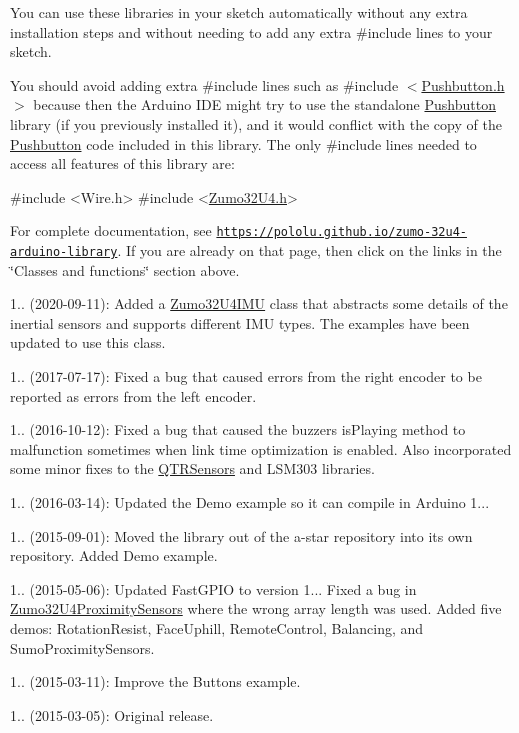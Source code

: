 You can use these libraries in your sketch automatically without any extra installation steps and without needing to add any extra {\ttfamily \#include} lines to your sketch.

You should avoid adding extra {\ttfamily \#include} lines such as {\ttfamily \#include $<$\hyperlink{_pushbutton_8h}{Pushbutton.\+h}$>$} because then the Arduino I\+DE might try to use the standalone \hyperlink{class_pushbutton}{Pushbutton} library (if you previously installed it), and it would conflict with the copy of the \hyperlink{class_pushbutton}{Pushbutton} code included in this library. The only {\ttfamily \#include} lines needed to access all features of this library are\+:


\begin{DoxyCode}
\textcolor{preprocessor}{#include <Wire.h>}
\textcolor{preprocessor}{#include <\hyperlink{_zumo32_u4_8h}{Zumo32U4.h}>}
\end{DoxyCode}


For complete documentation, see \href{https://pololu.github.io/zumo-32u4-arduino-library}{\tt https\+://pololu.\+github.\+io/zumo-\/32u4-\/arduino-\/library}. If you are already on that page, then click on the links in the \char`\"{}\+Classes and functions\char`\"{} section above.


\begin{DoxyItemize}
\item 1.. (2020-\/09-\/11)\+: Added a \hyperlink{class_zumo32_u4_i_m_u}{Zumo32\+U4\+I\+MU} class that abstracts some details of the inertial sensors and supports different I\+MU types. The examples have been updated to use this class.
\item 1.. (2017-\/07-\/17)\+: Fixed a bug that caused errors from the right encoder to be reported as errors from the left encoder.
\item 1.. (2016-\/10-\/12)\+: Fixed a bug that caused the buzzer\textquotesingle{}s {\ttfamily is\+Playing} method to malfunction sometimes when link time optimization is enabled. Also incorporated some minor fixes to the \hyperlink{class_q_t_r_sensors}{Q\+T\+R\+Sensors} and L\+S\+M303 libraries.
\item 1.. (2016-\/03-\/14)\+: Updated the Demo example so it can compile in Arduino 1...
\item 1.. (2015-\/09-\/01)\+: Moved the library out of the a-\/star repository into its own repository. Added Demo example.
\item 1.. (2015-\/05-\/06)\+: Updated Fast\+G\+P\+IO to version 1... Fixed a bug in \hyperlink{class_zumo32_u4_proximity_sensors}{Zumo32\+U4\+Proximity\+Sensors} where the wrong array length was used. Added five demos\+: Rotation\+Resist, Face\+Uphill, Remote\+Control, Balancing, and Sumo\+Proximity\+Sensors.
\item 1.. (2015-\/03-\/11)\+: Improve the Buttons example.
\item 1.. (2015-\/03-\/05)\+: Original release. 
\end{DoxyItemize}